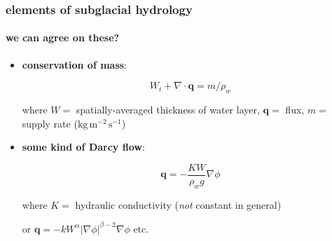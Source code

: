 \documentclass[hide notes,intlimits]{beamer}
\begin{document}
\begin{frame}
  \frametitle{elements of subglacial hydrology}
  \framesubtitle{we can agree on these?}

\newcommand{\bq}{\mathbf{q}}

  \begin{itemize}
    \item \textbf{conservation of mass}:
    
    $$W_t + \nabla \cdot \bq = m / \rho_w$$

where $W=$ spatially-averaged thickness of water layer, $\bq=$ flux, $m=$ supply rate ($\text{kg}\,\text{m}^{-2}\,\text{s}^{-1}$)



    \item \textbf{some kind of Darcy flow}:
    
    $$\bq = - \frac{K W}{\rho_w g} \nabla \phi$$
    
    where $K=$ hydraulic conductivity (\emph{not} constant in general)
    
    \medskip\medskip
    \scriptsize or \quad $\bq = - k W^\alpha |\nabla \phi|^{\beta - 2} \nabla \phi$ \quad etc.

  \end{itemize}

\end{frame}
\end{document}
